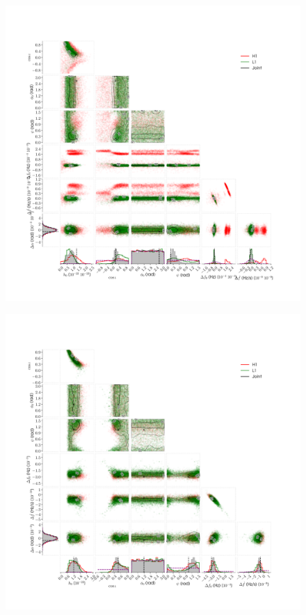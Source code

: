 \begin{figure}[!phtb]
\begin{center}
\includegraphics[width=1\columnwidth]{./figures/codeeval/simulations/signal_freq/one/ffdot_inj1}
\caption{ \protect}
\end{center}
\end{figure}


\begin{figure}[!phtb]
\begin{center}
\includegraphics[width=1\columnwidth]{./figures/codeeval/simulations/signal_freq/two/ffdot_inj2}
\caption{ \protect}
\end{center}
\end{figure}


